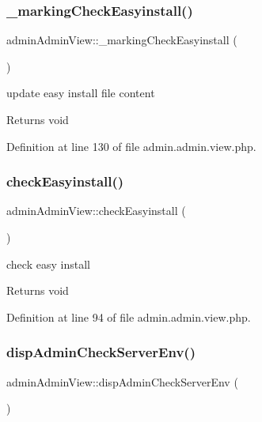 \subsubsection{\texorpdfstring{\+\_\+marking\+Check\+Easyinstall()}{\_markingCheckEasyinstall()}}
{\footnotesize\ttfamily admin\+Admin\+View\+::\+\_\+marking\+Check\+Easyinstall (\begin{DoxyParamCaption}{ }\end{DoxyParamCaption})}

update easy install file content \begin{DoxyReturn}{Returns}
void 
\end{DoxyReturn}


Definition at line 130 of file admin.\+admin.\+view.\+php.

\mbox{\label{classadminAdminView_ae7b11554f7c30beb8554d15b33852dd7}} 
\subsubsection{\texorpdfstring{check\+Easyinstall()}{checkEasyinstall()}}
{\footnotesize\ttfamily admin\+Admin\+View\+::check\+Easyinstall (\begin{DoxyParamCaption}{ }\end{DoxyParamCaption})}

check easy install \begin{DoxyReturn}{Returns}
void 
\end{DoxyReturn}


Definition at line 94 of file admin.\+admin.\+view.\+php.

\mbox{\label{classadminAdminView_a4041d717f643f568e4aad570e8a60e47}} 
\subsubsection{\texorpdfstring{disp\+Admin\+Check\+Server\+Env()}{dispAdminCheckServerEnv()}}
{\footnotesize\ttfamily admin\+Admin\+View\+::disp\+Admin\+Check\+Server\+Env (\begin{DoxyParamCaption}{ }\end{DoxyParamCaption})}



